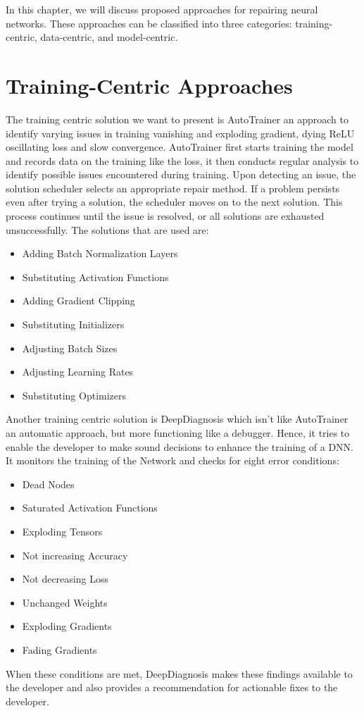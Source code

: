 In this chapter, we will discuss proposed approaches for repairing neural networks.
These approaches \cite{nakagawa_experience_2023} can be classified into three categories: training-centric, data-centric, and model-centric.

\section{Training-Centric Approaches}\label{sec:training-centric-approaches}
The training centric solution we want to present is AutoTrainer\cite{zhang_autotrainer_2021} an approach to identify varying issues in training vanishing and exploding gradient, dying ReLU oscillating loss and slow convergence.
AutoTrainer first starts training the model and records data on the training like the loss, it then conducts regular analysis to identify possible issues encountered during training.
Upon detecting an issue, the solution scheduler selects an appropriate repair method.
If a problem persists even after trying a solution, the scheduler moves on to the next solution.
This process continues until the issue is resolved, or all solutions are exhausted unsuccessfully.
The solutions that are used are:
\begin{itemize}
    \item Adding Batch Normalization Layers
    \item Substituting Activation Functions
    \item Adding Gradient Clipping
    \item Substituting Initializers
    \item Adjusting Batch Sizes
    \item Adjusting Learning Rates
    \item Substituting Optimizers
\end{itemize}
Another training centric solution is DeepDiagnosis which isn't like AutoTrainer an automatic approach, but more functioning like a debugger.
Hence, it tries to enable the developer to make sound decisions to enhance the training of a DNN.
It monitors the training of the Network and checks for eight error conditions:
\begin{itemize}
    \item Dead Nodes
    \item Saturated Activation Functions
    \item Exploding Tensors
    \item Not increasing Accuracy
    \item Not decreasing Loss
    \item Unchanged Weights
    \item Exploding Gradients
    \item Fading Gradients
\end{itemize}
When these conditions are met, DeepDiagnosis\cite{wardat_deepdiagnosis_2021} makes these findings available to the developer and also provides a recommendation for actionable fixes to the developer.
